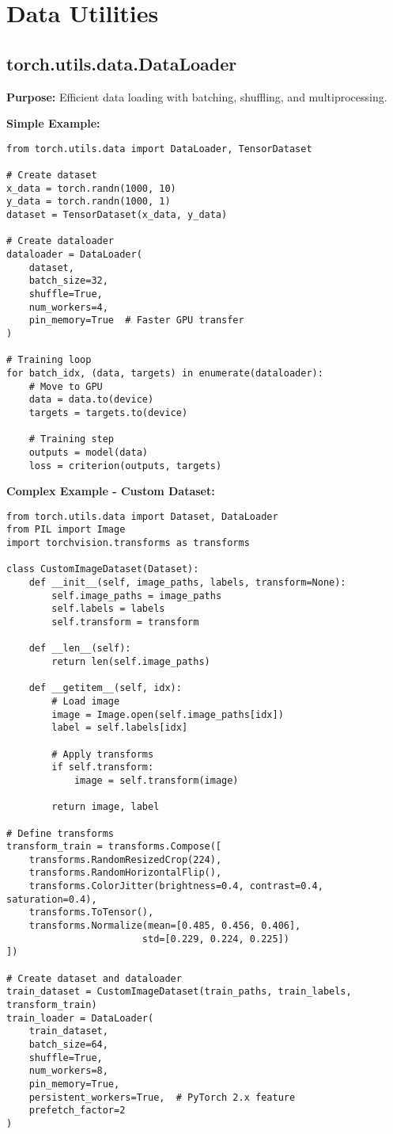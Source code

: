 \documentclass[11pt,a4paper]{book}
\begin{document}
\section{Data Utilities}

\subsection{torch.utils.data.DataLoader}

\textbf{Purpose:} Efficient data loading with batching, shuffling, and multiprocessing.

\textbf{Simple Example:}
\begin{verbatim}
from torch.utils.data import DataLoader, TensorDataset

# Create dataset
x_data = torch.randn(1000, 10)
y_data = torch.randn(1000, 1)
dataset = TensorDataset(x_data, y_data)

# Create dataloader
dataloader = DataLoader(
    dataset,
    batch_size=32,
    shuffle=True,
    num_workers=4,
    pin_memory=True  # Faster GPU transfer
)

# Training loop
for batch_idx, (data, targets) in enumerate(dataloader):
    # Move to GPU
    data = data.to(device)
    targets = targets.to(device)
    
    # Training step
    outputs = model(data)
    loss = criterion(outputs, targets)
\end{verbatim}

\textbf{Complex Example - Custom Dataset:}
\begin{verbatim}
from torch.utils.data import Dataset, DataLoader
from PIL import Image
import torchvision.transforms as transforms

class CustomImageDataset(Dataset):
    def __init__(self, image_paths, labels, transform=None):
        self.image_paths = image_paths
        self.labels = labels
        self.transform = transform
    
    def __len__(self):
        return len(self.image_paths)
    
    def __getitem__(self, idx):
        # Load image
        image = Image.open(self.image_paths[idx])
        label = self.labels[idx]
        
        # Apply transforms
        if self.transform:
            image = self.transform(image)
        
        return image, label

# Define transforms
transform_train = transforms.Compose([
    transforms.RandomResizedCrop(224),
    transforms.RandomHorizontalFlip(),
    transforms.ColorJitter(brightness=0.4, contrast=0.4, saturation=0.4),
    transforms.ToTensor(),
    transforms.Normalize(mean=[0.485, 0.456, 0.406], 
                        std=[0.229, 0.224, 0.225])
])

# Create dataset and dataloader
train_dataset = CustomImageDataset(train_paths, train_labels, transform_train)
train_loader = DataLoader(
    train_dataset,
    batch_size=64,
    shuffle=True,
    num_workers=8,
    pin_memory=True,
    persistent_workers=True,  # PyTorch 2.x feature
    prefetch_factor=2
)
\end{verbatim}
\end{document}
